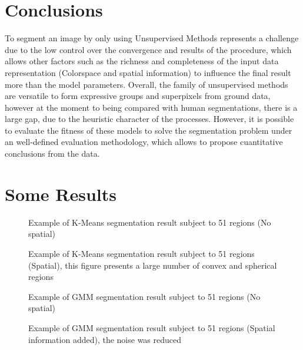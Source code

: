 \documentclass[10pt,twocolumn,letterpaper]{article}
\begin{document}
\section{Conclusions}
To segment an image by only using Unsupervised Methods represents a challenge due to the low control over the convergence and results of the procedure, which allows other factors such as the richness and completeness of the input data representation (Colorspace and spatial information) to influence the final result more than the model parameters. Overall, the family of unsupervised methods are versatile to form expressive groups and superpixels from ground data, however at the moment to being compared with human segmentations, there is a large gap, due to the heuristic character of the processes. However, it is possible to evaluate the fitness of these models to solve the segmentation problem under an well-defined evaluation methodology, which allows to propose cuantitative conclusions from the data. 



{\small


}


\newpage
\section{Some Results}
\begin{figure}[H]
	\centering
	\caption{Example of K-Means segmentation result subject to 51 regions (No spatial)}
	\label{Fig:kmeans1}
\end{figure}


\begin{figure}[H]
	\centering
	\caption{Example of K-Means segmentation result subject to 51 regions (Spatial), this figure presents a large number of convex and spherical regions}
	\label{Fig:kmeans2}
\end{figure}

\begin{figure}[H]
	\centering
	\caption{Example of GMM segmentation result subject to 51 regions (No spatial)}
	\label{Fig:gmm1}
\end{figure}

\begin{figure}[H]
	\centering
	\caption{Example of GMM segmentation result subject to 51 regions (Spatial information added), the noise was reduced}
	\label{Fig:gmm2}
\end{figure}
\end{document}
